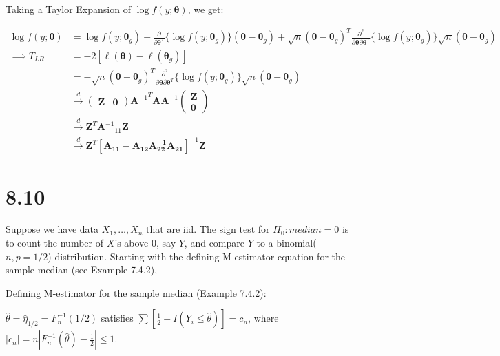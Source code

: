 \documentclass[
  letterpaper,
  DIV=11,
  numbers=noendperiod]{scrreprt}
\begin{document}
Taking a Taylor Expansion of \(\log f(y;\boldsymbol \theta)\), we get:

\[\begin{aligned}
\log f(y;\boldsymbol \theta) &= \log f(y;{\boldsymbol \theta}_g) + \frac \partial {\partial \boldsymbol \theta^T} \{\log f(y;  {\boldsymbol \theta}_g)\}(\boldsymbol \theta - {\boldsymbol \theta}_g) + \sqrt n(\boldsymbol \theta - \boldsymbol \theta_g)^T\frac {\partial^2} {\partial \boldsymbol \theta \partial \boldsymbol \theta^T} \{\log f(y;{\boldsymbol \theta}_g)\}\sqrt n(\boldsymbol \theta -  {\boldsymbol \theta}_g) \\
\implies T_{LR} &= -2[\ell(\boldsymbol \theta)- \ell (\boldsymbol \theta_g)] \\
&= -\sqrt n(\boldsymbol \theta - \boldsymbol \theta_g)^T\frac {\partial^2} {\partial \boldsymbol \theta \partial \boldsymbol \theta^T} \{\log f(y;  {\boldsymbol \theta}_g)\}\sqrt n(\boldsymbol \theta -  {\boldsymbol \theta}_g) \\
& \overset d \to \begin{pmatrix} \mathbf Z & \mathbf 0 \end{pmatrix} {\mathbf A^{-1}}^T{\mathbf {AA}^{-1}} \begin{pmatrix} \mathbf Z \\ \mathbf 0 \end{pmatrix} \\
& \overset d \to  \mathbf Z ^T{\mathbf {A}^{-1}}_{11} \mathbf Z \\
& \overset d \to  \mathbf Z ^T[\mathbf{A_{11}- A_{12}A_{22}^{-1}A_{21}}]^{-1} \mathbf Z
\end{aligned}\]

\newpage

\hypertarget{section-48}{%
\section{8.10}\label{section-48}}

Suppose we have data \(X_1, \dots, X_n\) that are iid. The sign test for
\(H_0: median = 0\) is to count the number of \(X\)'s above \(0\), say
\(Y\), and compare \(Y\) to a binomial(\(n,p=1/2\)) distribution.
Starting with the defining M-estimator equation for the sample median
(see Example 7.4.2),

Defining M-estimator for the sample median (Example 7.4.2):

\(\hat \theta = \hat \eta_{1/2} = F_n^{-1}(1/2)\) satisfies
\(\sum \left[\frac 1 2 - I(Y_i \leq \hat \theta) \right] = c_n\), where
\(|c_n| = n\left|F_n^{-1}(\hat \theta)- \frac 1 2\right| \leq 1\).
\end{document}

